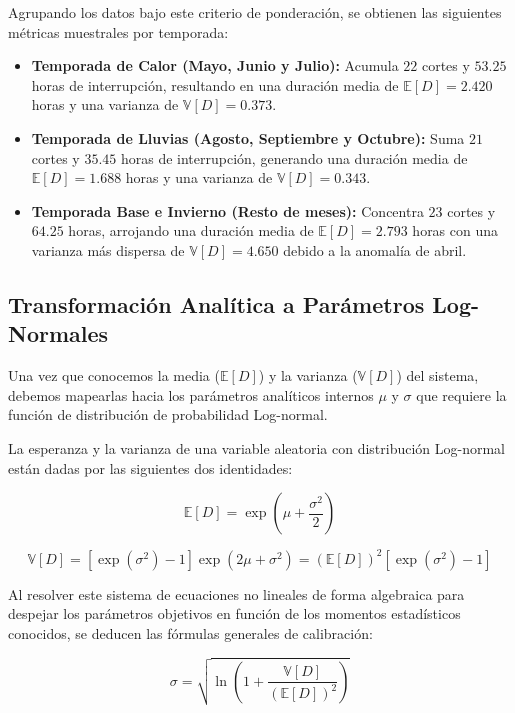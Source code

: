 \documentclass[
  spanish,
  letterpaper,
  DIV=11,
  numbers=noendperiod]{scrreprt}
\theoremstyle{plain}
\theoremstyle{definition}
\theoremstyle{remark}
\begin{document}
Agrupando los datos bajo este criterio de ponderación, se obtienen las
siguientes métricas muestrales por temporada:

\begin{itemize}
\item
  \textbf{Temporada de Calor (Mayo, Junio y Julio):} Acumula \(22\)
  cortes y \(53.25\) horas de interrupción, resultando en una duración
  media de \(\mathbb{E}[D] = 2.420\) horas y una varianza de
  \(\mathbb{V}[D] = 0.373\).
\item
  \textbf{Temporada de Lluvias (Agosto, Septiembre y Octubre):} Suma
  \(21\) cortes y \(35.45\) horas de interrupción, generando una
  duración media de \(\mathbb{E}[D] = 1.688\) horas y una varianza de
  \(\mathbb{V}[D] = 0.343\).
\item
  \textbf{Temporada Base e Invierno (Resto de meses):} Concentra \(23\)
  cortes y \(64.25\) horas, arrojando una duración media de
  \(\mathbb{E}[D] = 2.793\) horas con una varianza más dispersa de
  \(\mathbb{V}[D] = 4.650\) debido a la anomalía de abril.
\end{itemize}

\subsection{Transformación Analítica a Parámetros
Log-Normales}\label{transformaciuxf3n-analuxedtica-a-paruxe1metros-log-normales}

Una vez que conocemos la media (\(\mathbb{E}[D]\)) y la varianza
(\(\mathbb{V}[D]\)) del sistema, debemos mapearlas hacia los parámetros
analíticos internos \(\mu\) y \(\sigma\) que requiere la función de
distribución de probabilidad Log-normal.

La esperanza y la varianza de una variable aleatoria con distribución
Log-normal están dadas por las siguientes dos identidades:

\[
\mathbb{E}[D] = \exp\left(\mu + \frac{\sigma^2}{2}\right)
\]

\[
\mathbb{V}[D] = \left[\exp(\sigma^2) - 1\right] \exp(2\mu + \sigma^2) = (\mathbb{E}[D])^2 \left[\exp(\sigma^2) - 1\right]
\]

Al resolver este sistema de ecuaciones no lineales de forma algebraica
para despejar los parámetros objetivos en función de los momentos
estadísticos conocidos, se deducen las fórmulas generales de
calibración:

\[
\sigma = \sqrt{\ln\left(1 + \frac{\mathbb{V}[D]}{(\mathbb{E}[D])^2}\right)}
\]
\end{document}
